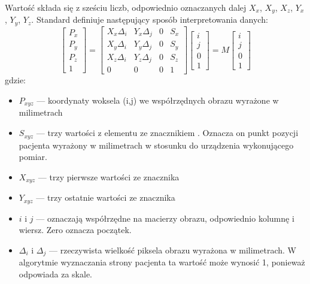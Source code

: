 \par
Wartość  składa się z sześciu liczb, odpowiednio oznaczanych dalej $X_x$, $X_y$, $X_z$, $Y_x$, $Y_y$, $Y_z$.
Standard \DICOM definiuje następujący sposób interpretowania danych:
\[
    \begin{bmatrix}
        P_x \\ P_y \\ P_z \\ 1
    \end{bmatrix}
    =
    \begin{bmatrix}
        X_x\Delta_i & Y_x\Delta_j & 0 & S_x \\
        X_y\Delta_i & Y_y\Delta_j & 0 & S_y \\
        X_z\Delta_i & Y_z\Delta_j & 0 & S_z \\
        0           & 0           & 0 & 1
    \end{bmatrix}
    \begin{bmatrix}
        i \\ j \\ 0 \\ 1
    \end{bmatrix}
    =
    M
    \begin{bmatrix}
        i \\ j \\ 0 \\ 1
    \end{bmatrix}
\]
gdzie:
\begin{itemize}
    \item $P_{xyz}$ --- koordynaty woksela (i,j) we współrzędnych obrazu wyrażone w milimetrach
    \item $S_{xyz}$ --- trzy wartości z elementu ze znacznikiem . Oznacza on punkt pozycji pacjenta wyrażony w milimetrach w stosunku do urządzenia wykonującego pomiar.
    \item $X_{xyz}$ --- trzy pierwsze wartości ze znacznika 
    \item $Y_{xyz}$ --- trzy ostatnie wartości ze znacznika 
    \item $i$ i $j$ --- oznaczają współrzędne na macierzy obrazu, odpowiednio kolumnę i wiersz. Zero oznacza początek.
    \item $\Delta_i$ i $\Delta_j$ --- rzeczywista wielkość piksela obrazu wyrażona w milimetrach.
          W algorytmie wyznaczania strony pacjenta ta wartość może wynosić 1, ponieważ odpowiada za skale.
\end{itemize}

